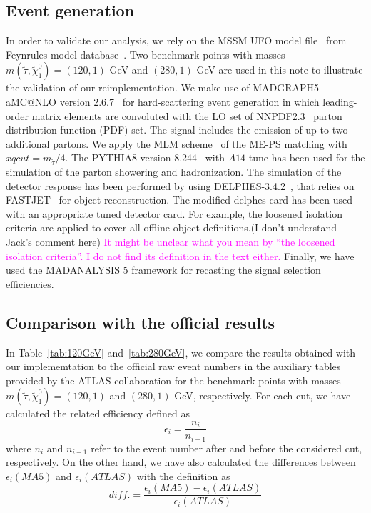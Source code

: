\documentclass{ws-mpla}
\begin{document}
\subsection{Event generation}

In order to validate our analysis, we rely on the MSSM UFO model file~\cite{Duhr:2011se} from Feynrules model database~\cite{Alloul:2013bka}. 
Two benchmark points with masses $ m(\tilde{\tau},\tilde{\chi}^0_1)=(120,1) $ GeV and $ (280,1) $ GeV are used in this note to illustrate the validation of our reimplementation. 
We make use of MADGRAPH5 aMC@NLO version 2.6.7~\cite{Alwall:2014hca} for hard-scattering event generation in which leading-order matrix elements are convoluted with the {\color{blue}LO set of} NNPDF2.3~\cite{Ball:2012cx} parton distribution function (PDF) set. The signal includes the emission of up to two additional partons. We apply the MLM scheme~\cite{Mangano:2006rw,Alwall:2008qv} of the ME-PS matching with $xqcut = m_{\tilde{\tau}}/4$.
The PYTHIA8 version 8.244~\cite{Sjostrand:2007gs} with $A14$ tune has been used for the simulation of the parton showering and hadronization. The simulation of the detector response has been performed by using DELPHES-3.4.2~\cite{deFavereau:2013fsa}, that relies on FASTJET~\cite{Cacciari:2011ma} for object reconstruction.
The modified delphes card has been used with an appropriate tuned detector card.
{\color{red}For example, the loosened isolation criteria are applied to cover all offline object definitions.(I don't understand Jack's comment here)}
\textcolor{magenta}{It might be unclear what you mean by ``the loosened isolation criteria''.  I do not find its definition in the text either.}
Finally, we have used the {\color{blue}MADANALYSIS 5 framework for recasting} the signal selection efficiencies.



\subsection{Comparison with the official results}
In Table~\ref{tab:120GeV} and~\ref{tab:280GeV}, we compare the results obtained with our implememtation to the official raw event numbers in the auxiliary tables provided by the ATLAS collaboration for the benchmark points with masses $m(\tilde{\tau},\tilde{\chi}^0_1)=(120,1) $ and $(280,1)$ GeV, respectively. 
For each cut, we have calculated the related efficiency defined as 
\begin{equation}
\epsilon_i =\frac{n_i}{n_{i-1}}
\end{equation}
where $ n_i $ and $ n_{i-1} $ {\color{blue}refer to} the event number after and before the considered cut, respectively.
%
On the other hand, we have also calculated the differences between $ \epsilon_i (MA5)$ and $ \epsilon_i (ATLAS)$ with the definition as
\begin{equation}
diff. = \frac{\epsilon_i (MA5)-\epsilon_i (ATLAS)}{\epsilon_i (ATLAS)}
\end{equation}
\end{document}
